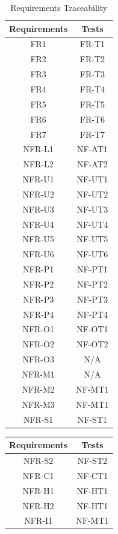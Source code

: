 \documentclass[12pt, titlepage]{article}
\begin{document}
\begin{table}[H]
	\centering
	\caption{Requirements Traceability}
	\label{my-label}
	\begin{tabular}{|c|c|}
		\hline
		\textbf{Requirements} & \textbf{Tests} \\ \hline
		FR1 & FR-T1 \\ \hline
		FR2 & FR-T2 \\ \hline
		FR3 & FR-T3 \\ \hline
		FR4 & FR-T4 \\ \hline
		FR5 & FR-T5 \\ \hline
		FR6 & FR-T6 \\ \hline
		FR7 & FR-T7 \\ \hline
		NFR-L1 & NF-AT1 \\ \hline
    NFR-L2 & NF-AT2 \\ \hline
    NFR-U1 & NF-UT1 \\ \hline
    NFR-U2 & NF-UT2 \\ \hline
    NFR-U3 & NF-UT3 \\ \hline
    NFR-U4 & NF-UT4 \\ \hline
    NFR-U5 & NF-UT5\\ \hline
    NFR-U6 & NF-UT6 \\ \hline
    NFR-P1 & NF-PT1 \\ \hline
    NFR-P2 & NF-PT2 \\ \hline
    NFR-P3 & NF-PT3 \\ \hline
    NFR-P4 & NF-PT4 \\ \hline
    NFR-O1 & NF-OT1 \\ \hline
    NFR-O2 & NF-OT2 \\ \hline
    NFR-O3 & N/A \\ \hline
    NFR-M1 & N/A \\ \hline
    NFR-M2 & NF-MT1 \\ \hline
    NFR-M3 & NF-MT1 \\ \hline
    NFR-S1 & NF-ST1 \\ \hline
	\end{tabular}
\end{table}

\newpage

\begin{table}[H]
	\centering
	\begin{tabular}{|c|c|}
		\hline
		\textbf{Requirements} & \textbf{Tests} \\ \hline
    NFR-S2 & NF-ST2 \\ \hline
    NFR-C1 & NF-CT1 \\ \hline
    NFR-H1 & NF-HT1 \\ \hline
    NFR-H2 & NF-HT1 \\ \hline
    NFR-I1 & NF-MT1 \\ \hline
	\end{tabular}
\end{table}
\end{document}
